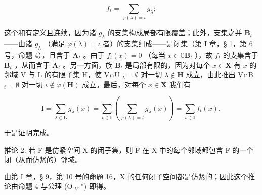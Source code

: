 \[
f _ {t} = \sum_ {\varphi (\lambda) = t} g _ {\lambda};
\]

这个和有定义且连续，因为诸 \(g_{\lambda}\) 的支集构成局部有限覆盖；此外，支集之并 \(\mathbf{B}_{t}\) ——由诸 \(g_{\lambda}\) （满足 \(\varphi(\lambda)=\iota\) 者）的支集组成——是闭集（第 I 章，§ 1，第 6 号，命题 4），且含于 \(\mathbf{A}_{t}\) 。由于 \(f_{t}(x)=0\) （每当 \(x\in\complement\mathbf{B}_{t}\) ），故 \(f_{t}\) 的支集含于 \(\mathbf{B}_{t}\) ，从而含于 \(\mathbf{A}_{t}\) 。另一方面，族 \(\mathbf{B}_{t}\) 是局部有限的，因为对每个 \(x\in\mathbf{X}\) 有 \(x\) 的邻域 V 与 L 的有限子集 H，使 V∩U \(_{\lambda}=\emptyset\) 对一切 \(\lambda\notin\mathbf{H}\) 成立，由此推出 V∩B \(_{t}=\emptyset\) 对一切 \(\iota\notin\varphi(\mathbf{H})\) 成立。最后，对每个 \(x\in\mathbf{X}\) 我们有

\[
\mathrm{I} = \sum_ {\lambda \in \mathbf {L}} g _ {\lambda} (x) = \sum_ {t \in \mathbf {I}} \left(\sum_ {\varphi (\lambda) = t} g _ {\lambda} (x)\right) = \sum_ {t \in \mathbf {I}} f _ {t} (x),
\]

于是证明完成。

推论 2. 若 F 是仿紧空间 X 的闭子集，则 F 在 X 中的每个邻域都包含 F 的一个闭（从而仿紧的）邻域。

由第 I 章，§ 9，第 10 号的命题 16，X 的任何闭子空间都是仿紧的；因此这个推论由命题 4 与公理 (O \(_{V}\) '') 即得。
\relax{}
